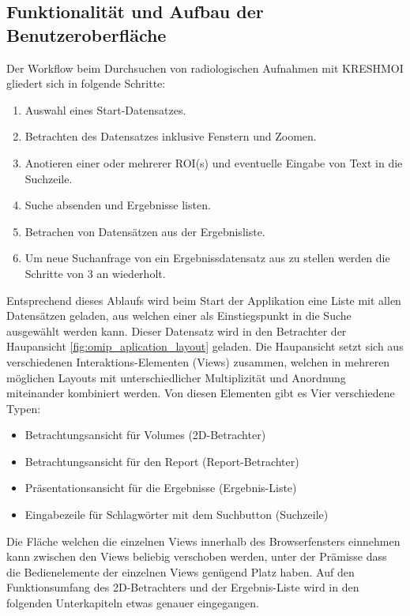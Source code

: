\subsection{Funktionalität und Aufbau der Benutzeroberfläche}
\label{sec:Funktionalität und Aufbau der Benutzeroberfläche}
Der Workflow beim Durchsuchen von radiologischen Aufnahmen mit KRESHMOI gliedert sich in folgende Schritte:
\begin{enumerate}
	\item Auswahl eines Start-Datensatzes.
	\item Betrachten des Datensatzes inklusive Fenstern und Zoomen.
	\item Anotieren einer oder mehrerer ROI(s) und eventuelle Eingabe von Text in die Suchzeile.
	\item Suche absenden und Ergebnisse listen.
	\item Betrachen von Datensätzen aus der Ergebnisliste.
	\item Um neue Suchanfrage von ein Ergebnissdatensatz aus zu stellen werden die Schritte von 3 an wiederholt.
\end{enumerate}
Entsprechend dieses Ablaufs wird beim Start der Applikation eine Liste mit allen Datensätzen geladen, 
aus welchen einer als Einstiegspunkt in die Suche ausgewählt werden kann.
Dieser Datensatz wird in den Betrachter der Haupansicht \ref{fig:omip_aplication_layout} geladen.
Die Haupansicht setzt sich aus verschiedenen Interaktions-Elementen (Views) zusammen,
welchen in mehreren möglichen Layouts mit unterschiedlicher Multiplizität und Anordnung miteinander kombiniert werden.
Von diesen Elementen gibt es Vier verschiedene Typen:
\begin{itemize}
	\item Betrachtungsansicht für Volumes (2D-Betrachter)
	\item Betrachtungsansicht für den Report (Report-Betrachter)
	\item Präsentationsansicht für die Ergebnisse (Ergebnis-Liste)
	\item Eingabezeile für Schlagwörter mit dem Suchbutton (Suchzeile)
\end{itemize}
Die Fläche welchen die einzelnen Views innerhalb des Browserfensters einnehmen kann zwischen den Views beliebig verschoben werden, 
unter der Prämisse dass die Bedienelemente der einzelnen Views genügend Platz haben.
Auf den Funktionsumfang des 2D-Betrachters und der Ergebnis-Liste wird in den folgenden Unterkapiteln etwas genauer eingegangen.
